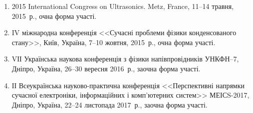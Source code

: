 \begin{enumerate}[label=\arabic*.,leftmargin=1em,itemindent=1em]
\item
2015 International Congress on Ultrasonics. Metz, France, 11--14 травня, 2015~р., очна форма участі.

\item
IV міжнародна конференція <<Сучасні проблеми фізики конденсованого стану>>, Київ, Україна, 7--10 жовтня, 2015~р., очна форма участі.

\item
VІІ Українська наукова конференція з фізики напівпровідників УНКФН--7, Дніпро, Україна, 26--30 вересня 2016~р., заочна форма участі.


\item
ІІ Всеукраїнська науково-практична конференція <<Перспективні напрямки
сучасної електроніки,
інформаційних і комп'ютерних
систем>> МЕІСS-2017, Дніпро, Україна, 22--24 листопада 2017~р., заочна форма участі.

\end{enumerate}
%
%
%
%
